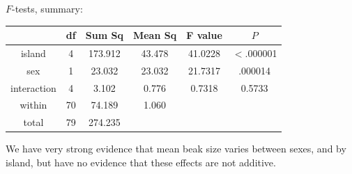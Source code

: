 \begin{frame}{$F$-tests, summary:}

  \begin{center}
    \begin{tabular}{c|ccccc}
 & df & Sum Sq & Mean Sq & F value & $P$  \\
 \hline
island & 4 & 173.912 & 43.478 & 41.0228 & $<$.000001 \\
sex & 1 & 23.032 & 23.032 & 21.7317 & .000014 \\
interaction & 4 & 3.102 & 0.776 & 0.7318 & 0.5733  \\
within & 70 & 74.189 & 1.060 &  & \\
\hline
total & 79 & 274.235 & & & \\
\end{tabular}
\end{center}


    \vspace{2em}

     We have very strong evidence that mean beak size varies between sexes, and by island, but have no evidence that these effects are not additive.

\end{frame}

